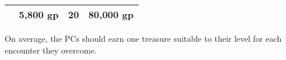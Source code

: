 \begin{longtable}{llllllll}
\hline
\multicolumn{5}{p{1.278in}|}{\begin{minipage}[t]{1.278in}\centering
10\end{minipage}} & \multicolumn{1}{|p{0.825in}|}{\begin{minipage}[t]{0.825in}\raggedright
5,800 gp\end{minipage}} & \multicolumn{1}{p{1.000in}|}{\begin{minipage}[t]{1.000in}\raggedright
20\end{minipage}} & \multicolumn{1}{p{0.875in}|}{\begin{minipage}[t]{0.875in}\raggedright
80,000 gp\end{minipage}}\\
\hline
\end{longtable}

\vspace{12pt}
On average, the PCs should earn one treasure suitable to their level for each encounter 
they overcome. 

